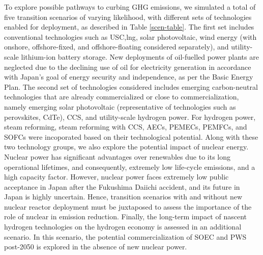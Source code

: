 To explore possible pathways to curbing \gls{GHG} emissions, we simulated a total of five transition scenarios of varying likelihood, with different sets of technologies enabled for deployment, as described in Table \ref{scen-table}. The first set includes conventional technologies such as  \gls{USC},\gls{lng}, solar photovoltaic, wind energy (with onshore, offshore-fixed, and offshore-floating considered separately), and utility-scale lithium-ion battery storage. New deployments of oil-fuelled power plants are neglected due to the declining use of oil for electricity generation in accordance with Japan's goal of energy security and independence, as per the Basic Energy Plan. The second set of technologies considered includes emerging carbon-neutral technologies that are already commercialized or close to commercialization, namely emerging solar photovoltaic (representative of technologies such as perovskites, CdTe), \gls{CCS}, and utility-scale hydrogen power. For hydrogen power, steam reforming, steam reforming with \gls{CCS}, \glspl{AEC}, \glspl{PEMEC}, \glspl{PEMFC}, and \glspl{SOFC} were incoporated based on their technological potential. Along with these two technology groups, we also explore the potential impact of nuclear energy. Nuclear power has significant advantages over renewables due to its long operational lifetimes, and consequently, extremely low life-cycle emissions, and a high capacity factor. However, nuclear power faces extremely low public acceptance in Japan after the Fukushima Daiichi accident, and its future in Japan is highly uncertain. Hence, transition scenarios with and without new nuclear reactor deployment must be juxtaposed to assess the importance of the role of nuclear in emission reduction. Finally, the long-term impact of nascent hydrogen technologies on the hydrogen economy is assessed in an additional scenario. In this scenario, the potential commercialization of \gls{SOEC} and \gls{PWS} post-2050 is explored in the absence of new nuclear power.

